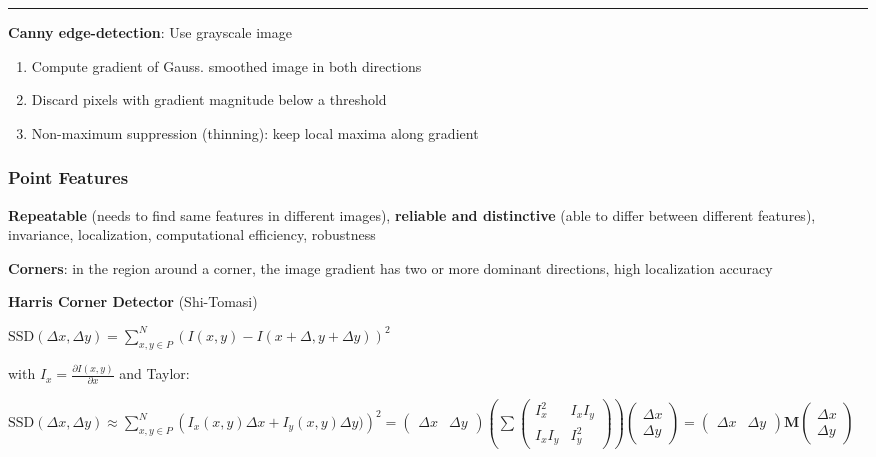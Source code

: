 \documentclass[fontsize=6pt]{scrartcl}
\newcommand{\mat}[1]{\mathbf{#1}}
\begin{document}
\begin{multicols*}{4}
\hrule
\vspace{4pt}

\textbf{Canny edge-detection}:	Use grayscale image
\begin{enumerate}
	\item Compute gradient of Gauss. smoothed image in both directions
	\item Discard pixels with gradient magnitude below a threshold
	\item Non-maximum suppression (thinning): keep local maxima along gradient
\end{enumerate}

\subsubsection*{Point Features}

\textbf{Repeatable} (needs to find same features in different images), \textbf{reliable and distinctive} (able to differ between different features), invariance, localization, computational efficiency, robustness

\textbf{Corners}: in the region around a corner, the image gradient has two or more dominant directions, high localization accuracy

\textbf{Harris Corner Detector} (Shi-Tomasi)

$\mathrm{SSD}(\Delta x, \Delta y) = \sum_{x,y \in P}^N \left( I(x,y) - I(x+\Delta, y + \Delta y) \right)^2$

with $I_x =\frac{\partial I(x,y)}{\partial x}$ and Taylor:

$\mathrm{SSD}(\Delta x, \Delta y) \approx \sum_{x,y \in P}^N \left( I_x(x,y) \Delta x + I_y(x,y) \Delta y) \right)^2
= \left(\begin{smallmatrix}
\Delta x &
\Delta y
\end{smallmatrix}
\right)
\left(
\sum \left(
\begin{smallmatrix}
I_x^2 & I_x I_y\\
I_x I_y & I_y^2
\end{smallmatrix}
\right)
\right)
\left(
\begin{smallmatrix}
\Delta x\\
\Delta y
\end{smallmatrix}
\right)
= \left(\begin{smallmatrix}
\Delta x &
\Delta y
\end{smallmatrix}
\right)
\mat M
\left(
\begin{smallmatrix}
\Delta x\\
\Delta y
\end{smallmatrix}
\right)
$


\end{multicols*}
\end{document}
